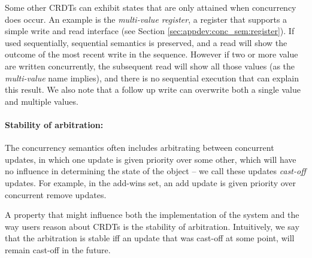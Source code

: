 \documentclass[12pt]{article}
\begin{document}

Some other CRDTs can exhibit states that are only attained when concurrency 
does occur. An example is the \emph{multi-value register}, 
a register that supports
a simple write and read interface (see Section \ref{sec:appdev:conc_sem:register}). 
If used sequentially, sequential semantics is preserved, and a read will show the 
outcome of the most recent write in the sequence. 
However if two or more value are written concurrently, the subsequent read will show 
all those values (as the \emph{multi-value} name implies), and there is no sequential 
execution that can explain this result. 
We also note that a follow up write can overwrite both a single value and multiple values. 

\paragraph{Stability of arbitration:}
The concurrency semantics often includes arbitrating between concurrent 
updates, in which one update is given priority over some other, which 
will have no influence in determining the state of the object -- we call these
updates \emph{cast-off} updates. 
For example, in the add-wins set, an add update is given priority over concurrent 
remove updates.

A property that might influence both the implementation of the system and the 
way users reason about CRDTs is the stability of arbitration. 
Intuitively, we say that the arbitration is stable iff an update that was cast-off 
at some point, will remain cast-off in the future.
\end{document}
